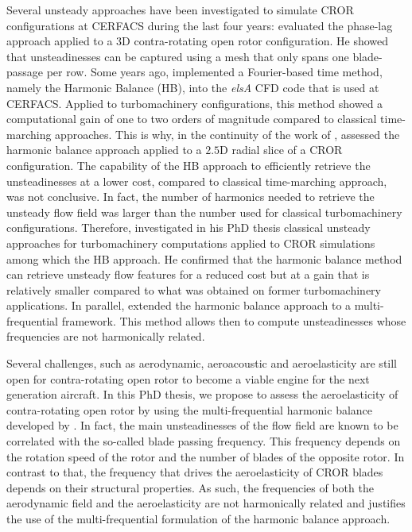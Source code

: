 Several unsteady approaches have been investigated 
to simulate CROR configurations at CERFACS during the
last four years: \citet{Burnazzi2010} evaluated the phase-lag approach
applied to a 3D contra-rotating open rotor configuration. He showed
that unsteadinesses can be captured using a mesh that only spans one
blade-passage per row. 
Some years ago, \citet{ThesisSicot} implemented a 
Fourier-based time method, namely the Harmonic Balance (HB),
into the \emph{elsA} CFD code that is used at CERFACS. Applied to turbomachinery
configurations, this method showed a computational gain
of one to two orders of magnitude 
compared to classical time-marching approaches.
This is why, in the continuity of the work
of \citet{Burnazzi2010}, \citet{Yabili2010} assessed 
the harmonic balance approach applied to 
a $2.5$D radial slice of a CROR configuration. 
The capability
of the HB approach to efficiently retrieve the unsteadinesses
at a lower cost, compared to classical time-marching approach,
 was not conclusive.
In fact, the number of harmonics needed to retrieve the unsteady
flow field was larger than the number used for classical
turbomachinery configurations.
Therefore, \citet{ThesisFrancois}
investigated  in his PhD thesis classical unsteady approaches for
turbomachinery computations applied to CROR simulations
among which the HB approach. 
He confirmed that
the harmonic balance method can retrieve unsteady
flow features for a reduced cost but at a gain that
is relatively smaller compared to what was
obtained on former turbomachinery applications. 
In parallel, \citet{ThesisGuedeney} extended the harmonic
balance approach to a multi-frequential framework. 
This method allows then to compute unsteadinesses whose frequencies
are not harmonically related.

Several challenges, such as aerodynamic,
aeroacoustic and aeroelasticity are still open 
for contra-rotating open rotor
to become a viable engine for the next generation aircraft.
In this PhD thesis, we propose to assess the aeroelasticity of 
contra-rotating open rotor by using the multi-frequential
harmonic balance developed by \citet{ThesisGuedeney}.
In fact, the main unsteadinesses of the flow field
are known to be correlated with the so-called
blade passing frequency. This frequency depends on the
rotation speed of the rotor and the number of blades
of the opposite rotor. In contrast to that, the 
frequency that drives the aeroelasticity of CROR
blades depends on their structural properties.
As such, the frequencies of both the aerodynamic
field and the aeroelasticity are not harmonically
related and justifies the use of the multi-frequential
formulation of the harmonic balance approach.


